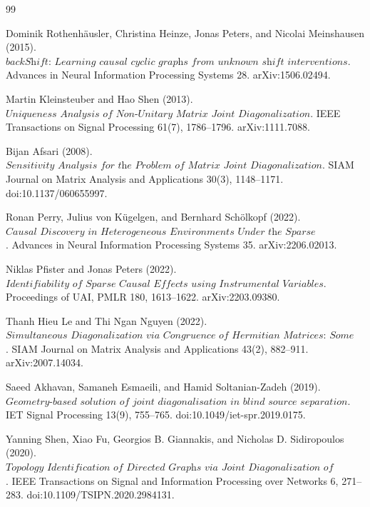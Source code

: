 \documentclass{article}
\begin{document}
\begin{thebibliography}{99}

   Dominik Rothenhäusler, Christina Heinze, Jonas Peters, and Nicolai Meinshausen (2015). \(\textit{backShift: Learning causal cyclic graphs from unknown shift interventions}\). Advances in Neural Information Processing Systems 28. arXiv:1506.02494.

   Martin Kleinsteuber and Hao Shen (2013). \(\textit{Uniqueness Analysis of Non-Unitary Matrix Joint Diagonalization}\). IEEE Transactions on Signal Processing 61(7), 1786--1796. arXiv:1111.7088.

   Bijan Afsari (2008). \(\textit{Sensitivity Analysis for the Problem of Matrix Joint Diagonalization}\). SIAM Journal on Matrix Analysis and Applications 30(3), 1148--1171. doi:10.1137/060655997.

   Ronan Perry, Julius von Kügelgen, and Bernhard Schölkopf (2022). \(\textit{Causal Discovery in Heterogeneous Environments Under the Sparse Mechanism Shift Hypothesis}\). Advances in Neural Information Processing Systems 35. arXiv:2206.02013.

   Niklas Pfister and Jonas Peters (2022). \(\textit{Identifiability of Sparse Causal Effects using Instrumental Variables}\). Proceedings of UAI, PMLR 180, 1613--1622. arXiv:2203.09380.

   Thanh Hieu Le and Thi Ngan Nguyen (2022). \(\textit{Simultaneous Diagonalization via Congruence of Hermitian Matrices: Some Equivalent Conditions and a Numerical Solution}\). SIAM Journal on Matrix Analysis and Applications 43(2), 882--911. arXiv:2007.14034.

   Saeed Akhavan, Samaneh Esmaeili, and Hamid Soltanian-Zadeh (2019). \(\textit{Geometry-based solution of joint diagonalisation in blind source separation}\). IET Signal Processing 13(9), 755--765. doi:10.1049/iet-spr.2019.0175.

   Yanning Shen, Xiao Fu, Georgios B. Giannakis, and Nicholas D. Sidiropoulos (2020). \(\textit{Topology Identification of Directed Graphs via Joint Diagonalization of Correlation Matrices}\). IEEE Transactions on Signal and Information Processing over Networks 6, 271--283. doi:10.1109/TSIPN.2020.2984131.


\end{thebibliography}
\end{document}
